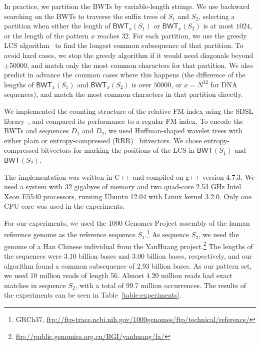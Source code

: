 \documentclass{llncs}
\newcommand{\BWT}
  {\ensuremath{\mathsf{BWT}}}
\begin{document}
In practice, we partition the BWTs by variable-length strings. We use
backward searching on the BWTs to traverse the suffix trees of $S_{1}$ and
$S_{2}$, selecting a partition when either the length of $\BWT_{x}(S_{1})$ or
$\BWT_{x}(S_{2})$ is at most $1024$, or the length of the pattern $x$ reaches
$32$. For each partition, we use the greedy LCS algorithm~\cite{Myers86} to
find the longest common subsequence of that partition. To avoid hard cases,
we stop the greedy algorithm if it would need diagonals beyond $\pm 50000$,
and match only the most common characters for that partition. We also predict
in advance the common cases where this happens (the difference of the lengths
of $\BWT_{x}(S_{1})$ and $\BWT_{x}(S_{2})$ is over $50000$, or $x = N^{32}$
for DNA sequences), and match the most common characters in that partition
directly.


We implemented the counting structure of the relative FM-index using the SDSL
library~\cite{Gog2014b}, and compared its performance to a regular FM-index.
To encode the BWTs and sequences $D_{1}$ and $D_{2}$, we used Huffman-shaped
wavelet trees with either plain or entropy-compressed (RRR)~\cite{Raman2007}
bitvectors. We chose entropy-compressed bitvectors for marking the positions
of the LCS in $\BWT(S_{1})$ and $\BWT(S_{2})$.

The implementation was written in C++ and compiled on g++ version 4.7.3. We
used a system with 32 gigabyes of memory and two quad-core 2.53 GHz Intel
Xeon E5540 processors, running Ubuntu 12.04 with Linux kernel 3.2.0. Only one
CPU core was used in the experiments.

For our experiments, we used the 1000 Genomes Project assembly of the human
reference genome as the reference sequence $S_{1}$.\footnote{GRCh37,
\url{ftp://ftp-trace.ncbi.nih.gov/1000genomes/ftp/technical/reference/}} As
sequence $S_{2}$, we used the genome of a Han Chinese individual from the
YanHuang
project.\footnote{\url{ftp://public.genomics.org.cn/BGI/yanhuang/fa/}} The
lengths of the sequences were 3.10 billion bases and 3.00 billion bases,
respectively, and our algorithm found a common subsequence of 2.93 billion
bases. As our pattern set, we used 10 million reads of length 56. Almost 4.20
million reads had exact matches in sequence $S_{2}$, with a total of 99.7
million occurrences. The results of the experiments can be seen in
Table~\ref{table:experiments}.
\end{document}
